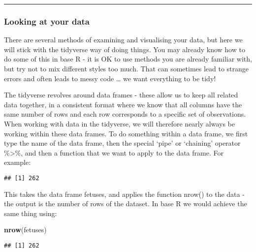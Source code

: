 \documentclass[
]{article}
\newenvironment{Shaded}{\begin{snugshade}}{\end{snugshade}}
\newcommand{\KeywordTok}[1]{\textcolor[rgb]{0.13,0.29,0.53}{\textbf{#1}}}
\newcommand{\NormalTok}[1]{#1}
\newcommand{\OperatorTok}[1]{\textcolor[rgb]{0.81,0.36,0.00}{\textbf{#1}}}
\newcommand{\StringTok}[1]{\textcolor[rgb]{0.31,0.60,0.02}{#1}}
\begin{document}
\begin{center}\rule{0.5\linewidth}{0.5pt}\end{center}

\hypertarget{looking-at-your-data}{%
\subsubsection{Looking at your data}\label{looking-at-your-data}}

There are several methods of examining and visualising your data, but
here we will stick with the tidyverse way of doing things. You may
already know how to do some of this in base R - it is OK to use methods
you are already familiar with, but try not to mix different styles too
much. That can sometimes lead to strange errors and often leads to messy
code \ldots{} we want everything to be tidy!

The tidyverse revolves around data frames - these allow us to keep all
related data together, in a consistent format where we know that all
columns have the same number of rows and each row corresponds to a
specific set of observations. When working with data in the tidyverse,
we will therefore nearly always be working within these data frames. To
do something within a data frame, we first type the name of the data
frame, then the special `pipe' or `chaining' operator \%\textgreater\%,
and then a function that we want to apply to the data frame. For
example:

\begin{Shaded}
\end{Shaded}

\begin{verbatim}
## [1] 262
\end{verbatim}

This takes the data frame fetuses, and applies the function nrow() to
the data - the output is the number of rows of the dataset. In base R we
would achieve the same thing using:

\begin{Shaded}
\begin{Highlighting}[]
\KeywordTok{nrow}\NormalTok{(fetuses)}
\end{Highlighting}
\end{Shaded}

\begin{verbatim}
## [1] 262
\end{verbatim}
\end{document}
